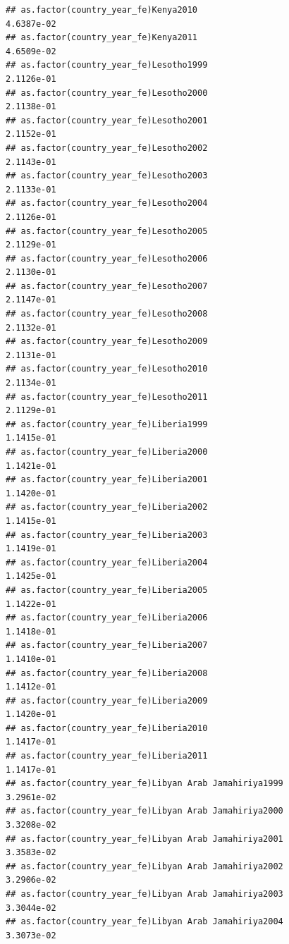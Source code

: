 \documentclass[
  a4paper,
]{article}
\begin{document}
\begin{verbatim}
## as.factor(country_year_fe)Kenya2010                             4.6387e-02
## as.factor(country_year_fe)Kenya2011                             4.6509e-02
## as.factor(country_year_fe)Lesotho1999                           2.1126e-01
## as.factor(country_year_fe)Lesotho2000                           2.1138e-01
## as.factor(country_year_fe)Lesotho2001                           2.1152e-01
## as.factor(country_year_fe)Lesotho2002                           2.1143e-01
## as.factor(country_year_fe)Lesotho2003                           2.1133e-01
## as.factor(country_year_fe)Lesotho2004                           2.1126e-01
## as.factor(country_year_fe)Lesotho2005                           2.1129e-01
## as.factor(country_year_fe)Lesotho2006                           2.1130e-01
## as.factor(country_year_fe)Lesotho2007                           2.1147e-01
## as.factor(country_year_fe)Lesotho2008                           2.1132e-01
## as.factor(country_year_fe)Lesotho2009                           2.1131e-01
## as.factor(country_year_fe)Lesotho2010                           2.1134e-01
## as.factor(country_year_fe)Lesotho2011                           2.1129e-01
## as.factor(country_year_fe)Liberia1999                           1.1415e-01
## as.factor(country_year_fe)Liberia2000                           1.1421e-01
## as.factor(country_year_fe)Liberia2001                           1.1420e-01
## as.factor(country_year_fe)Liberia2002                           1.1415e-01
## as.factor(country_year_fe)Liberia2003                           1.1419e-01
## as.factor(country_year_fe)Liberia2004                           1.1425e-01
## as.factor(country_year_fe)Liberia2005                           1.1422e-01
## as.factor(country_year_fe)Liberia2006                           1.1418e-01
## as.factor(country_year_fe)Liberia2007                           1.1410e-01
## as.factor(country_year_fe)Liberia2008                           1.1412e-01
## as.factor(country_year_fe)Liberia2009                           1.1420e-01
## as.factor(country_year_fe)Liberia2010                           1.1417e-01
## as.factor(country_year_fe)Liberia2011                           1.1417e-01
## as.factor(country_year_fe)Libyan Arab Jamahiriya1999            3.2961e-02
## as.factor(country_year_fe)Libyan Arab Jamahiriya2000            3.3208e-02
## as.factor(country_year_fe)Libyan Arab Jamahiriya2001            3.3583e-02
## as.factor(country_year_fe)Libyan Arab Jamahiriya2002            3.2906e-02
## as.factor(country_year_fe)Libyan Arab Jamahiriya2003            3.3044e-02
## as.factor(country_year_fe)Libyan Arab Jamahiriya2004            3.3073e-02

\end{verbatim}
\end{document}
